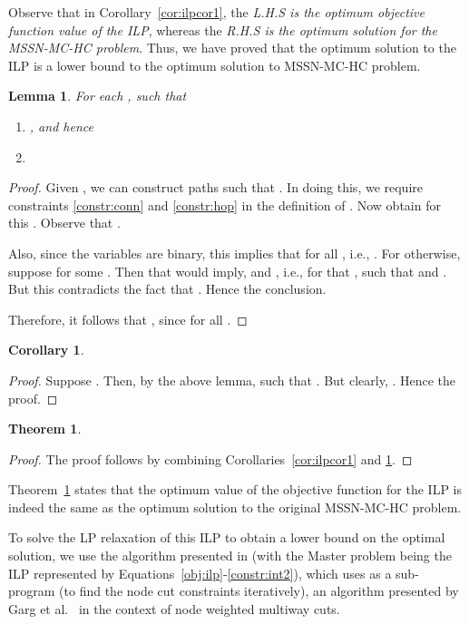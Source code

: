 \documentclass[conference]{IEEEtran}
\newtheorem{theorem}{Theorem}
\newtheorem{lemma}{Lemma}
\newtheorem{corollary}{Corollary}
\begin{document}
Observe that in Corollary~\ref{cor:ilpcor1}, the \emph{L.H.S is the optimum objective function value of the ILP}, whereas the \emph{R.H.S is the optimum solution for the MSSN-MC-HC problem}. Thus, we have proved that the optimum solution to the ILP is a lower bound to the optimum solution to MSSN-MC-HC problem.

\begin{lemma}
For each ,  such that 
\begin{enumerate}
\item , and hence
\item 
\end{enumerate}
\end{lemma}

\begin{proof}
Given , we can construct paths  such that . In doing this, we require constraints \eqref{constr:conn} and \eqref{constr:hop} in the definition of . Now obtain  for this . Observe that .

Also, since the variables are binary, this implies that  for all , i.e., . For otherwise, suppose  for some . Then that would imply,  and , i.e., for that ,  such that  and . But this contradicts the fact that . Hence the conclusion.

Therefore, it follows that , since  for all .  
\end{proof} 

\begin{corollary}
\label{cor:ilpcor2}

\end{corollary}

\begin{proof}
Suppose . Then, by the above lemma,  such that . But clearly, . Hence the proof.
\end{proof}

\begin{theorem}
\label{thm:ilp-main}

\end{theorem}

\begin{proof}
The proof follows by combining Corollaries~\ref{cor:ilpcor1} and \ref{cor:ilpcor2}.
\end{proof}

Theorem~\ref{thm:ilp-main} states that the optimum value of the objective function for the ILP is indeed the same as the optimum solution to the original MSSN-MC-HC problem.

To solve the LP relaxation of this ILP to obtain a lower bound on the optimal solution, we use the algorithm presented in \cite{nigam} (with the Master problem being the ILP represented by Equations~\eqref{obj:ilp}-\eqref{constr:int2}), which uses as a sub-program (to find the node cut constraints iteratively), an algorithm presented by Garg et al.\ \cite{garg} in the context of node weighted multiway cuts.
\end{document}
